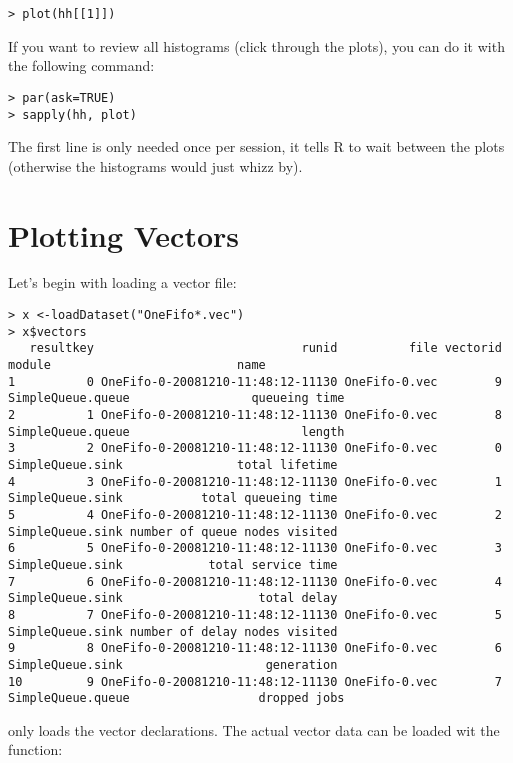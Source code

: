 \begin{verbatim}
> plot(hh[[1]])
\end{verbatim}

If you want to review all histograms (click through the plots), you can do it with
the following command:

\begin{verbatim}
> par(ask=TRUE)
> sapply(hh, plot)
\end{verbatim}

The first line is only needed once per session, it tells R to wait between the plots
(otherwise the histograms would just whizz by).


\section{Plotting Vectors}

Let's begin with loading a vector file:

\begin{verbatim}
> x <-loadDataset("OneFifo*.vec")
> x$vectors
   resultkey                             runid          file vectorid            module                          name
1          0 OneFifo-0-20081210-11:48:12-11130 OneFifo-0.vec        9 SimpleQueue.queue                 queueing time
2          1 OneFifo-0-20081210-11:48:12-11130 OneFifo-0.vec        8 SimpleQueue.queue                        length
3          2 OneFifo-0-20081210-11:48:12-11130 OneFifo-0.vec        0  SimpleQueue.sink                total lifetime
4          3 OneFifo-0-20081210-11:48:12-11130 OneFifo-0.vec        1  SimpleQueue.sink           total queueing time
5          4 OneFifo-0-20081210-11:48:12-11130 OneFifo-0.vec        2  SimpleQueue.sink number of queue nodes visited
6          5 OneFifo-0-20081210-11:48:12-11130 OneFifo-0.vec        3  SimpleQueue.sink            total service time
7          6 OneFifo-0-20081210-11:48:12-11130 OneFifo-0.vec        4  SimpleQueue.sink                   total delay
8          7 OneFifo-0-20081210-11:48:12-11130 OneFifo-0.vec        5  SimpleQueue.sink number of delay nodes visited
9          8 OneFifo-0-20081210-11:48:12-11130 OneFifo-0.vec        6  SimpleQueue.sink                    generation
10         9 OneFifo-0-20081210-11:48:12-11130 OneFifo-0.vec        7 SimpleQueue.queue                  dropped jobs
\end{verbatim}

 only loads the vector declarations. The actual vector data can be
loaded wit the  function:

